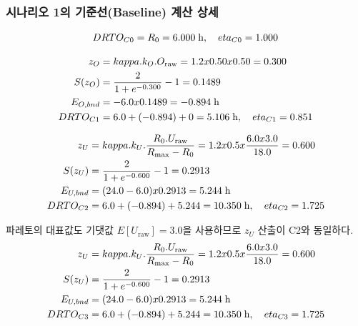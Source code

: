 
\subsubsection{시나리오 1의 기준선(Baseline) 계산 상세}
\label{app:golden-baseline}


\begin{equation*}
  \DRTO_{C0} = R_0 = 6.000\;\text{h}, \quad \eta_{C0} = 1.000
\end{equation*}

\begin{align*}
  z_O &= \kappa \cdot k_O \cdot O_{\text{raw}} = 1.2 \times 0.50 \times 0.50 = 0.300 \\
  S(z_O) &= \frac{2}{1+e^{-0.300}} - 1 = 0.1489 \\
  E_{O,bnd} &= -6.0 \times 0.1489 = \erf{-0.894}{-0.893}\;\text{h} \\
  \DRTO_{C1} &= 6.0 + (\erf{-0.894}{-0.893}) + 0 = \erf{5.106}{5.107}\;\text{h}, \quad \eta_{C1} = 0.851
\end{align*}

\begin{align*}
  z_U &= \kappa \cdot k_U \cdot \frac{R_0 \cdot U_{\text{raw}}}{R_{\max} - R_0}
       = 1.2 \times 0.5 \times \frac{6.0 \times 3.0}{18.0} = 0.600 \\
  S(z_U) &= \frac{2}{1+e^{-0.600}} - 1 = 0.2913 \\
  E_{U,bnd} &= (24.0 - 6.0) \times 0.2913 = 5.244\;\text{h} \\
  \DRTO_{C2} &= 6.0 + (\erf{-0.894}{-0.893}) + 5.244 = 10.350\;\text{h}, \quad \eta_{C2} = 1.725
\end{align*}

 파레토의 대표값도
기댓값 $E[U_{\text{raw}}] = 3.0$을 사용하므로 $z_U$ 산출이 C2와 동일하다.
\begin{align*}
  z_U &= \kappa \cdot k_U \cdot \frac{R_0 \cdot U_{\text{raw}}}{R_{\max} - R_0}
       = 1.2 \times 0.5 \times \frac{6.0 \times 3.0}{18.0} = 0.600 \\
  S(z_U) &= \frac{2}{1+e^{-0.600}} - 1 = 0.2913 \\
  E_{U,bnd} &= (24.0 - 6.0) \times 0.2913 = 5.244\;\text{h} \\
  \DRTO_{C3} &= 6.0 + (\erf{-0.894}{-0.893}) + 5.244 = 10.350\;\text{h}, \quad \eta_{C3} = 1.725
\end{align*}

